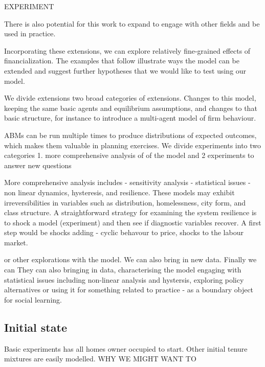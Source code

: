 EXPERIMENT

There is also potential for this work to expand to engage with other fields and be used in practice.



Incorporating these extensions, we can explore relatively fine-grained effects of financialization. The examples that follow  illustrate   ways the model can be extended and suggest further hypotheses that we  would like to test using our model.

We divide extensions two broad categories of extensions. Changes to this model, keeping the same basic agents and equilibrium assumptions, and changes to that basic structure, for instance to introduce a multi-agent model of firm behaviour.

ABMs can be run multiple times to produce distributions of expected outcomes, which makes them valuable in planning exercises.
We divide experiments into two categories 1. more comprehensive analysis of of the model and 2 experiments to answer new questions

More comprehensive analysis includes
- sensitivity analysis
- statistical issues
- non linear dynamics, hysteresis, and resilience. %
These models may exhibit irreversibilities in variables such as distribution, homelessness, city form, and class structure. 
A straightforward strategy for examining the system resilience is to shock a model (experiment) and then see if diagnostic variables recover. %
A first step would be shocks adding - cyclic behavour to price, shocks  to the labour market.

 or other explorations with the model. We can also bring in new data. Finally we can
They can also bringing in data, characterising the model engaging with statistical issues including non-linear analysis and hystersis, exploring policy alternatives or using it for something related to practice - as a boundary object for social learning.


\subsection{Initial state}
Basic experiments has all homes owner occupied to start. Other initial tenure mixtures are easily modelled. WHY WE MIGHT WANT TO

